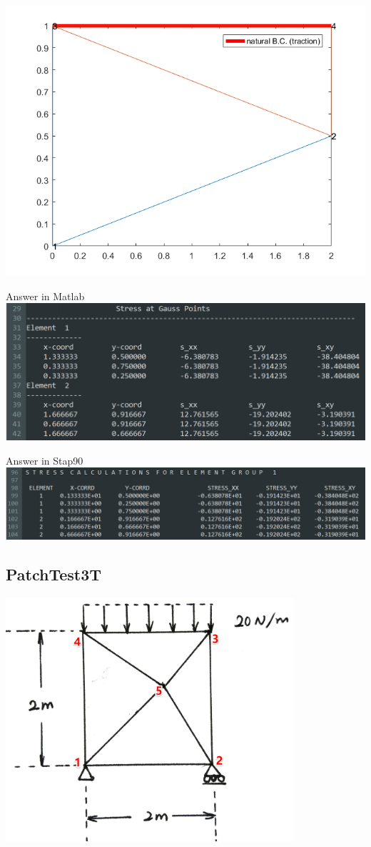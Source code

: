 \documentclass[UTF8]{ctexbook}
\begin{document}
\includegraphics[width=\textwidth]{Example_3T.png}

\newpage
Answer in Matlab\\

\includegraphics[width=\textwidth]{3T01.png}

Answer in Stap90\\

\includegraphics[width=\textwidth]{3T02.png}

\subsection{PatchTest3T}
\includegraphics[width=0.8\textwidth]{PatchTest_3T.jpg}
\end{document}
